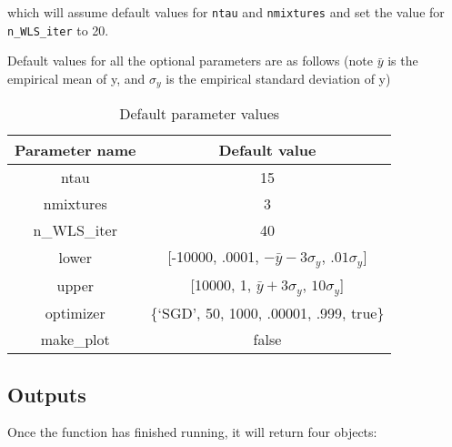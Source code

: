\documentclass[12pt]{article}
\begin{document}
which will assume default values for \lstinline{ntau} and \lstinline{nmixtures} and set the value for \lstinline{n_WLS_iter} to 20.

Default values for all the optional parameters are as follows (note $\bar{y}$ is the empirical mean of y, and $\sigma_y$ is the empirical standard deviation of y)

\begin{table}[h!]
\centering
\begin{tabular}{||c | c||}
    \hline
    Parameter name & Default value \\
    \hline
    ntau & 15 \\
    nmixtures & 3 \\
    n\_WLS\_iter & 40 \\
    lower & [-10000, .0001, $-\bar{y} - 3\sigma_y$, $.01\sigma_y$]\\
    upper & [10000, 1, $\bar{y} + 3\sigma_y$, $10\sigma_y$]\\
    optimizer & \{`SGD', 50, 1000, .00001, .999, true\}\\
    make\_plot & false \\
    \hline
\end{tabular}
\caption{Default parameter values}
\label{table:1}
\end{table}

\subsection{Outputs}

Once the function has finished running, it will return four objects:
\end{document}
